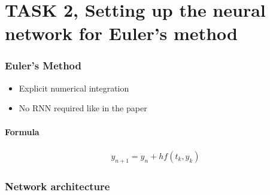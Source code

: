 \section{TASK 2, Setting up the neural network for Euler's method}

\begin{frame}
	\frametitle{Euler's Method}
	\begin{itemize}
		\item Explicit numerical integration
		\item No RNN required like in the paper
	\end{itemize}
	\paragraph{Formula}
	\begin{align}
		y_{n+1} = y_n + hf(t_k,y_k)\nonumber
	\end{align}
\end{frame}

\begin{frame}
	\frametitle{Network architecture}
\end{frame}
